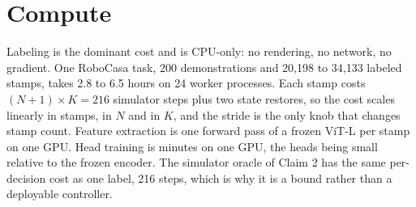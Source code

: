 \section{Compute}
\label{app:compute}

Labeling is the dominant cost and is CPU-only: no rendering, no network, no
gradient. One RoboCasa task, 200 demonstrations and 20{,}198 to 34{,}133
labeled stamps, takes 2.8 to 6.5 hours on 24 worker processes. Each stamp costs
$(N{+}1) \times K = 216$ simulator steps plus two state restores, so the cost
scales linearly in stamps, in $N$ and in $K$, and the stride is the only knob
that changes stamp count. Feature extraction is one forward pass of a frozen
ViT-L per stamp on one GPU. Head training is minutes on one GPU, the heads
being small relative to the frozen encoder. The simulator oracle of Claim 2 has
the same per-decision cost as one label, 216 steps, which is why it is a bound
rather than a deployable controller.
